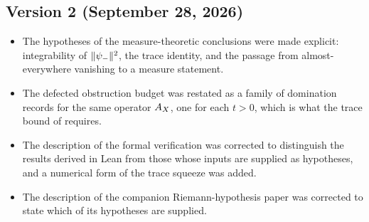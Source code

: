 \subsection*{Version 2 (September 28, 2026)}

\begin{itemize}
  \item The hypotheses of the measure-theoretic conclusions were made
    explicit: integrability of \(\|\psi_{-}\|^2\), the trace identity, and
    the passage from almost-everywhere vanishing to a measure
    statement.
  \item The defected obstruction budget was restated as a family of
    domination records for the same operator \(A_{X}\), one for each
    \(t>0\), which is what the trace bound of
     requires.
  \item The description of the formal verification was corrected to
    distinguish the results derived in Lean from those whose inputs are
    supplied as hypotheses, and a numerical form of the trace squeeze
    was added.
  \item The description of the companion Riemann-hypothesis paper was
    corrected to state which of its hypotheses are supplied.
\end{itemize}
